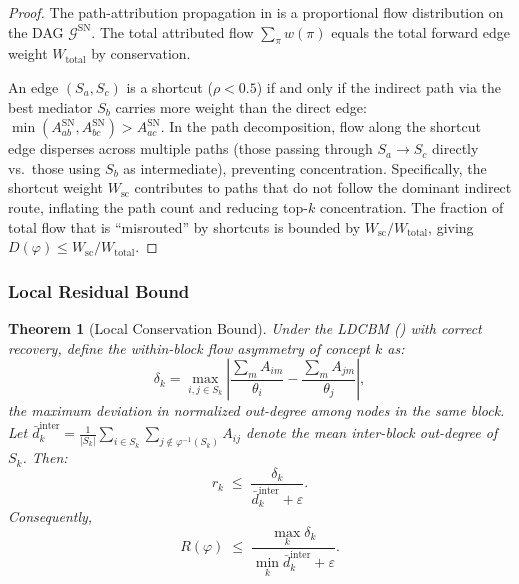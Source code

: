 \documentclass[11pt]{article}
\newtheorem{theorem}{Theorem}[section]
\newcommand{\cG}{\mathcal{G}}
\newcommand{\1}{\mathbbm{1}}
\newcommand{\eps}{\varepsilon}
\begin{document}
\begin{proof}
  The path-attribution propagation in  is a proportional flow distribution on the DAG $\cG^{\mathrm{SN}}$.
  The total attributed flow $\sum_\pi w(\pi)$ equals the total forward edge weight $W_{\mathrm{total}}$ by conservation.

  An edge $(S_a, S_c)$ is a shortcut ($\rho < 0.5$) if and only if the indirect path via the best mediator $S_b$ carries more weight than the direct edge: $\min(A^{\mathrm{SN}}_{ab}, A^{\mathrm{SN}}_{bc}) > A^{\mathrm{SN}}_{ac}$.
  In the path decomposition, flow along the shortcut edge disperses across multiple paths (those passing through $S_a \to S_c$ directly vs.\ those using $S_b$ as intermediate), preventing concentration.
  Specifically, the shortcut weight $W_{\mathrm{sc}}$ contributes to paths that do not follow the dominant indirect route, inflating the path count and reducing top-$k$ concentration.
  The fraction of total flow that is ``misrouted'' by shortcuts is bounded by $W_{\mathrm{sc}} / W_{\mathrm{total}}$, giving $D(\varphi) \le W_{\mathrm{sc}} / W_{\mathrm{total}}$.
\end{proof}

\subsubsection{Local Residual Bound}

\begin{theorem}[Local Conservation Bound]
\label{thm:local-residual}
  Under the LDCBM () with correct recovery, define the \emph{within-block flow asymmetry} of concept $k$ as:
  \[
    \delta_k = \max_{i, j \in S_k} \left|\frac{\sum_{m} A_{im}}{\theta_i} - \frac{\sum_{m} A_{jm}}{\theta_j}\right|,
  \]
  the maximum deviation in normalized out-degree among nodes in the same block.
  Let $\bar{d}^{\mathrm{inter}}_k = \frac{1}{|S_k|} \sum_{i \in S_k} \sum_{j \notin \varphi^{-1}(S_k)} A_{ij}$ denote the mean inter-block out-degree of $S_k$.
  Then:
  \begin{equation}
    r_k \;\le\; \frac{\delta_k}{\bar{d}^{\mathrm{inter}}_k + \eps}.
    \label{eq:R-bound}
  \end{equation}
  Consequently,
  \begin{equation}
    R(\varphi) \;\le\; \frac{\max_k \delta_k}{\min_k \bar{d}^{\mathrm{inter}}_k + \eps}.
    \label{eq:R-phi-bound}
  \end{equation}
\end{theorem}
\end{document}

